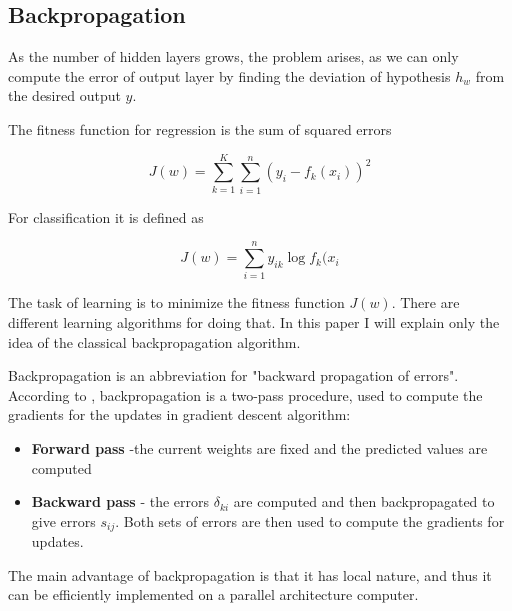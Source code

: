\subsection{Backpropagation}
As the number of hidden layers grows, the problem arises, as we can only compute the error of output layer by finding the deviation of hypothesis $ h_{w} $ from the desired output $ y $.

The fitness function for regression is the sum of squared errors
 
\begin{equation}
  J(w) = \sum_{k=1}^{K} \sum_{i=1}^{n} (y_{i} - f_{k}(x_{i}))^{2}
\end{equation}

For classification it is defined as

\begin{equation}
  J(w) = \sum_{i=1}^{n} y_{ik} \log{f_{k}(x_{i}}
\end{equation}

The task of learning is to minimize the fitness function $ J(w) $. There are different learning algorithms for doing that. In this paper I will explain only the idea of the classical backpropagation algorithm.

Backpropagation is an abbreviation for "backward propagation of errors". According to \cite{Hastie-et-al-2013}, backpropagation is a two-pass procedure, used to compute the gradients for the updates in gradient descent algorithm:

\begin{itemize}
  \item \textbf{Forward pass} -the current weights are fixed and the predicted values are computed
  \item \textbf{Backward pass} - the errors $ \delta_{ki} $ are computed and then backpropagated to give errors $ s_{ij} $. Both sets of errors are then used to compute the gradients for updates.
\end{itemize}

The main advantage of backpropagation is that it has local nature, and thus it can be efficiently implemented on a parallel architecture computer.


